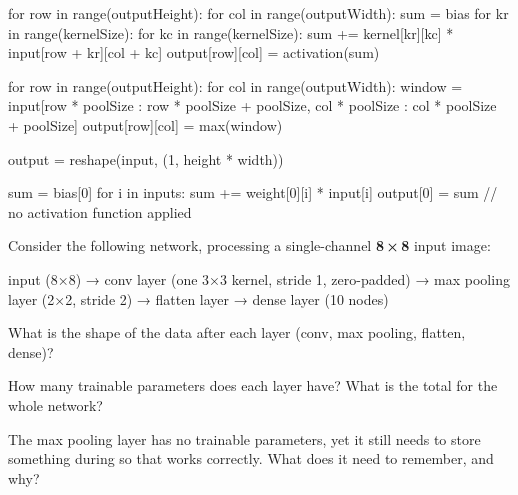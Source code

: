 \begin{pycode}
for row in range(outputHeight):
    for col in range(outputWidth):
        sum = bias
        for kr in range(kernelSize):
            for kc in range(kernelSize):
                sum += kernel[kr][kc] * input[row + kr][col + kc]
        output[row][col] = activation(sum)
\end{pycode}

\begin{pycode}
for row in range(outputHeight):
    for col in range(outputWidth):
        window = input[row * poolSize : row * poolSize + poolSize,
                        col * poolSize : col * poolSize + poolSize]
        output[row][col] = max(window)
\end{pycode}

\begin{pycode}
output = reshape(input, (1, height * width))
\end{pycode}

\begin{pycode}
sum = bias[0]
for i in inputs:
    sum += weight[0][i] * input[i]
output[0] = sum   // no activation function applied
\end{pycode}

\label{c10:set:5}
Consider the following network, processing a single-channel \textbf{8\,×\,8} input image:

\begin{console}
input (8×8)
  → conv layer (one 3×3 kernel, stride 1, zero-padded)
  → max pooling layer (2×2, stride 2)
  → flatten layer
  → dense layer (10 nodes)
\end{console}

\label{c10:ex:11}
What is the shape of the data after each layer (conv, max pooling, flatten, dense)?

\label{c10:ex:12}
How many trainable parameters does each layer have? What is the total for the whole network?

\label{c10:ex:13}
The max pooling layer has no trainable parameters, yet it still needs to store something during
 so that  works correctly. What does it need to remember,
and why?

